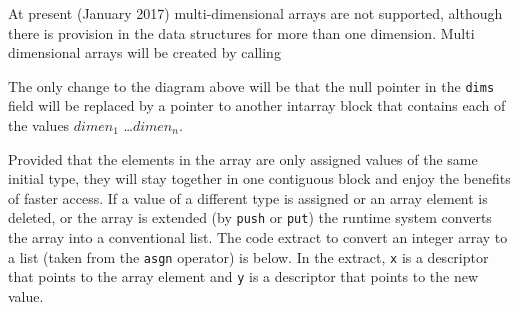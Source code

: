 At present (January 2017) multi-dimensional arrays are not supported,
although there is provision in the data structures for more than one
dimension. Multi dimensional arrays will be created by calling


The only change to the diagram above will be that the null pointer in the
\texttt{dims} field will be replaced by a pointer to another intarray block
that contains each of the values $dimen_1$ \dots $dimen_n$.

Provided that the elements in the array are only assigned values of the
same initial type, they will stay together in one contiguous block and
enjoy the benefits of faster access. If a value of a different type is
assigned or an array element is deleted, or the array is extended (by
\texttt{push} or \texttt{put}) the runtime system converts the array into a
conventional list. The code extract to convert an integer array to a list
(taken from the \texttt{asgn} operator) is below.  In the extract,
\texttt{x} is a descriptor that points to the array element and \texttt{y}
is a descriptor that points to the new value.

\goodbreak
{}

